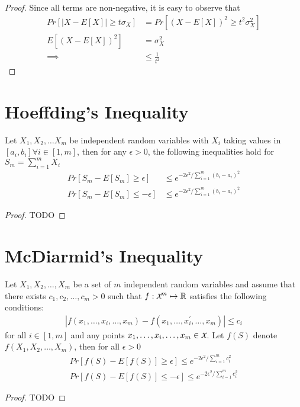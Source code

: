 \documentclass[../main]{subfiles}
\begin{document}
\begin{proof}
Since all terms are non-negative, it is easy to observe that
\begin{align}
Pr\left[ |X-E[X]| \geq t\sigma_X \right] &= Pr\left[ \left(X-E[X]\right)^2 \geq t^2 \sigma_X^2 \right] \nonumber \\
E\left[ \left(X-E[X]\right)^2 \right] &= \sigma_X^2 \tag{by definition of Variance} \\
\implies &\leq \frac{1}{t^2} \tag{by Markov's Inequality}
\end{align}
\end{proof}

\section{Hoeffding's Inequality}
\begin{theorem} \label{th:hoeffding_inq}
Let $X_1, X_2, \ldots X_m$ be independent random variables with $X_i$ taking values
in $[a_i,b_i] \forall i \in [1,m]$, then for any $\epsilon > 0$, the following inequalities hold
for $S_m = \sum_{i=1}^{m} X_i$
\begin{align}
Pr[S_m - E[S_m] \geq \epsilon] &\leq e^{- 2\epsilon^2 / \sum_{i=1}^m (b_i - a_i)^2} \\
Pr[S_m - E[S_m] \leq -\epsilon] &\leq e^{- 2\epsilon^2 / \sum_{i=1}^m (b_i - a_i)^2}
\end{align}
\end{theorem}
\begin{proof}
TODO
\end{proof}

\section{McDiarmid's Inequality}
\begin{theorem} \label{th:mcdiarmids_inq}
Let $X_1, X_2, \ldots, X_m$ be a set of $m$ independent random variables and assume
that there exists $c_1,c_2,\ldots,c_m > 0$ such that $f: \cursive{X}^m \mapsto \mathbb{R}$
satisfies the following conditions:
\begin{align}
\left| f(x_1,\ldots,x_i,\ldots,x_m) - f(x_1,\ldots,x_i^\prime,\ldots,x_m) \right| \leq c_i
\end{align}
for all $i \in [1,m]$ and any points $x_1,\ldots,x_i,\ldots,x_m \in \cursive{X}$. Let $f(S)$
denote $f(X_1,X_2,\ldots,X_m)$, then for all $\epsilon > 0$
\begin{align}
Pr\left[ f(S) - E[f(S)] \geq \epsilon \right] \leq e^{-2\epsilon^2 / \sum_{i=1}^{m} c_i^2} \\
Pr\left[ f(S) - E[f(S)] \leq -\epsilon \right] \leq e^{-2\epsilon^2 / \sum_{i=1}^{m} c_i^2}
\end{align}
\end{theorem}
\begin{proof}
TODO
\end{proof}
\end{document}

